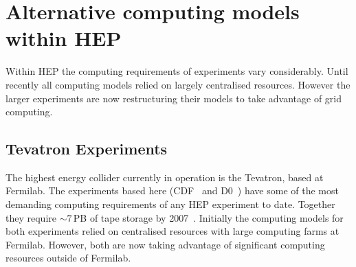 
\section{Alternative computing models within HEP}
Within HEP the computing requirements of experiments vary considerably. Until recently all computing models relied on largely centralised resources. However the larger experiments are now restructuring their models to take advantage of grid computing.

\subsection{Tevatron Experiments}
The highest energy collider currently in operation is the Tevatron, based at Fermilab. The experiments based here (CDF~\cite{cdf} and D0~\cite{d0}) have some of the most demanding computing requirements of any HEP experiment to date. Together they require $\sim7$\,PB of tape storage by 2007~\cite{run2_comp_review}. Initially the computing models for both experiments relied on centralised resources with large computing farms at Fermilab. However, both are now taking advantage of significant computing resources outside of Fermilab. 

